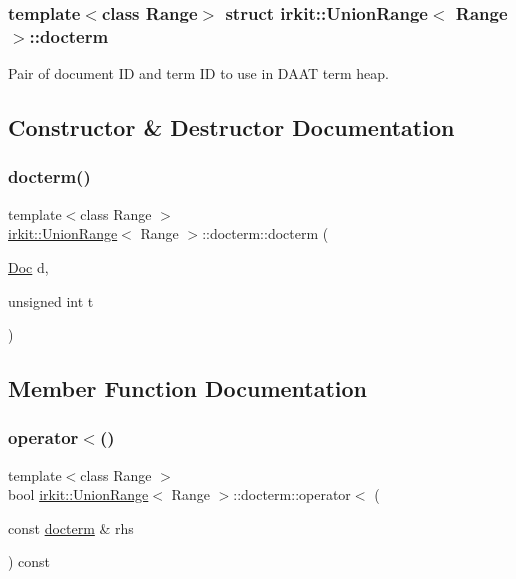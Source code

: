 \subsubsection*{template$<$class Range$>$\newline
struct irkit\+::\+Union\+Range$<$ Range $>$\+::docterm}

Pair of document ID and term ID to use in D\+A\+AT term heap. 

\subsection{Constructor \& Destructor Documentation}
\mbox{\label{structirkit_1_1UnionRange_1_1docterm_a5a45bee16d82935e804cf2a0a492a3c5}} 
\subsubsection{\texorpdfstring{docterm()}{docterm()}}
{\footnotesize\ttfamily template$<$class Range $>$ \\
\mbox{\hyperlink{classirkit_1_1UnionRange}{irkit\+::\+Union\+Range}}$<$ Range $>$\+::docterm\+::docterm (\begin{DoxyParamCaption}\item[{\mbox{\hyperlink{classirkit_1_1UnionRange_a387589b1f09868b60485c4ab8c61f97a}{Doc}}}]{d,  }\item[{unsigned int}]{t }\end{DoxyParamCaption})\hspace{0.3cm}{\ttfamily [inline]}}



\subsection{Member Function Documentation}
\mbox{\label{structirkit_1_1UnionRange_1_1docterm_a5f4842c5758933c11d28a00aa5a66262}} 
\subsubsection{\texorpdfstring{operator$<$()}{operator<()}}
{\footnotesize\ttfamily template$<$class Range $>$ \\
bool \mbox{\hyperlink{classirkit_1_1UnionRange}{irkit\+::\+Union\+Range}}$<$ Range $>$\+::docterm\+::operator$<$ (\begin{DoxyParamCaption}\item[{const \mbox{\hyperlink{structirkit_1_1UnionRange_1_1docterm}{docterm}} \&}]{rhs }\end{DoxyParamCaption}) const\hspace{0.3cm}{\ttfamily [inline]}}

